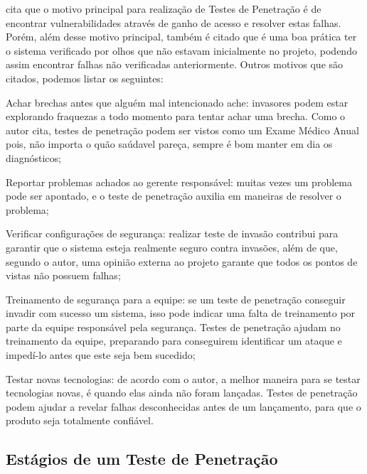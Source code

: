  cita que o motivo principal para realização de Testes de Penetração é de encontrar vulnerabilidades através de ganho de acesso e resolver estas falhas. Porém, além desse motivo principal, também é citado que é uma boa prática ter o sistema verificado por olhos que não estavam inicialmente no projeto, podendo assim encontrar falhas não verificadas anteriormente. Outros motivos que são citados, podemos listar os seguintes:

\begin{alineas}
  \item Achar brechas antes que alguém mal intencionado ache: invasores podem estar explorando fraquezas a todo momento para tentar achar uma brecha. Como o autor cita, testes de penetração podem ser vistos como um Exame Médico Anual pois, não importa o quão saúdavel pareça, sempre é bom manter em dia os diagnósticos;
  \item Reportar problemas achados ao gerente responsável: muitas vezes um problema pode ser apontado, e o teste de penetração auxilia em maneiras de resolver o problema;
  \item Verificar configurações de segurança: realizar teste de invasão contribui para garantir que o sistema esteja realmente seguro contra invasões, além de que, segundo o autor, uma opinião externa ao projeto garante que todos os pontos de vistas não possuem falhas;
  \item Treinamento de segurança para a equipe: se um teste de penetração conseguir invadir com sucesso um sistema, isso pode indicar uma falta de treinamento por parte da equipe responsável pela segurança. Testes de penetração ajudam no treinamento da equipe, preparando para conseguirem identificar um ataque e impedí-lo antes que este seja bem sucedido;
  \item Testar novas tecnologias: de acordo com o autor, a melhor maneira para se testar tecnologias novas, é quando elas ainda não foram lançadas. Testes de penetração podem ajudar a revelar falhas desconhecidas antes de um lançamento, para que o produto seja totalmente confiável.
\end{alineas}


\subsection{Estágios de um Teste de Penetração}
\label{ss.stagespentest}

